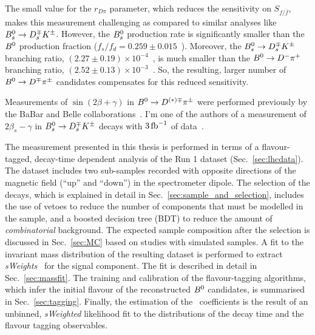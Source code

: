 The small value for the $r_{D\pi}$ parameter, which reduces the sensitivity on $S_{f/\bar f}$, makes this measurement challenging 
as compared to similar analyses like $B^0_s\rightarrow D^{\mp}_sK^\pm$. 
However, the $B^0_s$ production rate is significantly smaller 
than the $B^0$ production fraction ($f_s/f_d=0.259\pm0.015$~\cite{LHCb:2013lka}). 
Moreover, the $B^0_s\rightarrow D^{\mp}_sK^\pm$ branching ratio, $(2.27\pm0.19)\times 10^{-4}$~\cite{Louvot:2008sc}, is much smaller than 
the $B^0\rightarrow D^-\pi^+$ branching ratio, $(2.52\pm0.13)\times 10^{-3}$~\cite{PDG2017}.  
So, the resulting, larger number of $B^0\rightarrow D^\mp\pi^\pm$ candidates compensates for this reduced sensitivity.

Measurements of $\sin(2\beta+\gamma)$ in $B^0\rightarrow D^{(*)\mp}\pi^\pm$ were performed previously
by the BaBar and Belle collaborations~\cite{Aubert:2006tw,Aubert:2005yf,Bahinipati:2011yq,PhysRevD.73.092003}.
I'm one of the authors of a measurement of $2\beta_s - \gamma$ in $B^0_s\rightarrow D^{\mp}_sK^\pm$ decays with $3\mbox{\,fb}^{-1}$ of data~\cite{LHCb-PAPER-2017-047}.

The measurement presented in this thesis is performed in terms of a flavour-tagged, decay-time dependent
analysis of the Run 1 dataset (Sec.~\ref{sec:lhcdata}). The dataset includes two sub-samples recorded with opposite
directions of the magnetic field (``up'' and ``down'') in the spectrometer dipole.
The selection of the decays, which is explained in detail in Sec.~\ref{sec:sample_and_selection}, includes
the use of vetoes to reduce the number of components that must be modelled in the sample, and
a boosted decision tree (BDT) to reduce the amount of \emph{combinatorial} background. The expected sample
composition after the selection is discussed in Sec.~\ref{sec:MC} based on
studies with simulated samples. A fit to the invariant mass distribution of the
resulting dataset is performed to extract \emph{sWeights}~\cite{Pivk:2004ty} for the signal component. The
fit is described in detail in Sec.~\ref{sec:massfit}. The training and
calibration of the flavour-tagging algorithms, which infer the initial flavour
of the reconstructed $B^0$ candidates, is summarised in
Sec.~\ref{sec:tagging}. Finally, the estimation of the \CP~coefficients is
the result of an unbinned, \emph{sWeighted} likelihood fit to the distributions of the
decay time and the flavour tagging observables. 
